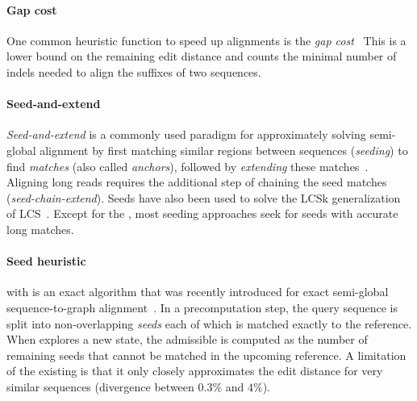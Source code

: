 
\paragraph{Gap cost} One common heuristic function to speed up alignments is the
\emph{gap
cost}~\citep{ukkonen1985algorithms,myers1995chaining,spouge1989speeding,wu90onp,papamichail2009improved}
This is a lower bound on the remaining edit distance and counts the minimal
number of indels needed to align the suffixes of two sequences.

\paragraph{Seed-and-extend}
\emph{Seed-and-extend} is a commonly used paradigm for approximately solving
semi-global alignment by first matching similar regions between sequences
(\emph{seeding}) to find \emph{matches} (also called \emph{anchors}), followed by
\emph{extending} these matches~\citep{kucherov2019evolution}. Aligning long
reads requires the additional step of chaining the seed matches
(\emph{seed-chain-extend}). Seeds have also been used to solve the LCSk
generalization of LCS~\citep{benson2014longest,pavetic2017fast}. Except for the
\sh \citep{ivanov2022fast}, most seeding approaches seek for seeds with accurate
long matches.

\paragraph{Seed heuristic}
\A with \emph{\sh} is an exact algorithm that was recently introduced for
exact semi-global sequence-to-graph alignment~\citep{ivanov2022fast}. In a
precomputation step, the query sequence is split into non-overlapping
\emph{seeds} each of which is matched exactly to the reference. When \A explores
a new state, the admissible \sh is computed as the number of remaining seeds
that cannot be matched in the upcoming reference. A limitation of the existing
\sh is that it only closely approximates the edit distance for very
similar sequences (divergence between $0.3\%$ and $4\%$).
